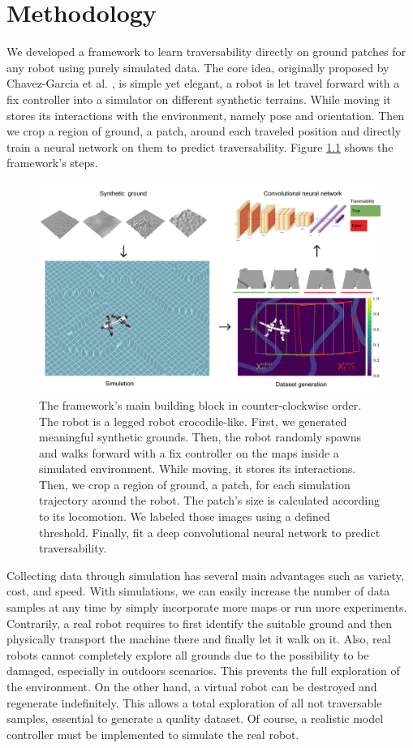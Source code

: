 \documentclass[../document.tex]{subfiles}
\begin{document}
\chapter{Methodology}
\label{chap: methodology}
We developed a framework to learn traversability directly on ground patches for any robot using purely simulated data. The core idea, originally proposed by Chavez-Garcia et al. \cite{omar2018traversability}, is simple yet elegant, a robot is let travel forward with a fix controller into a simulator on different synthetic terrains. While moving it stores its interactions with the environment, namely pose and orientation. Then we crop a region of ground, a patch, around each traveled position and directly train a neural network on them to predict traversability. Figure \ref{fig : pipeline} shows the framework's steps.

\begin{figure} [htbp]
    \centering
        \includegraphics[width=\textwidth]{../img/method.png}
    \caption{The framework's main building block in counter-clockwise order. The robot is a legged robot crocodile-like. First, we generated meaningful synthetic grounds. Then, the robot randomly spawns and walks forward with a fix controller on the maps inside a simulated environment. While moving, it stores its interactions. Then, we crop a region of ground, a patch, for each simulation trajectory around the robot. The patch's size is calculated according to its locomotion. We labeled those images using a defined threshold. Finally, fit a deep convolutional neural network to predict traversability. }
    \label{fig : pipeline}
    \end{figure}
Collecting data through simulation has several main advantages such as variety, cost, and speed. With simulations, we can easily increase the number of data samples at any time by simply incorporate more maps or run more experiments. Contrarily, a real robot requires to first identify the suitable ground and then physically transport the machine there and finally let it walk on it. Also, real robots cannot completely explore all grounds due to the possibility to be damaged, especially in outdoors scenarios. This prevents the full exploration of the environment. On the other hand, a virtual robot can be destroyed and regenerate indefinitely. This allows a total exploration of all not traversable samples, essential to generate a quality dataset. Of course, a realistic model controller must be implemented to simulate the real robot.
\end{document}

